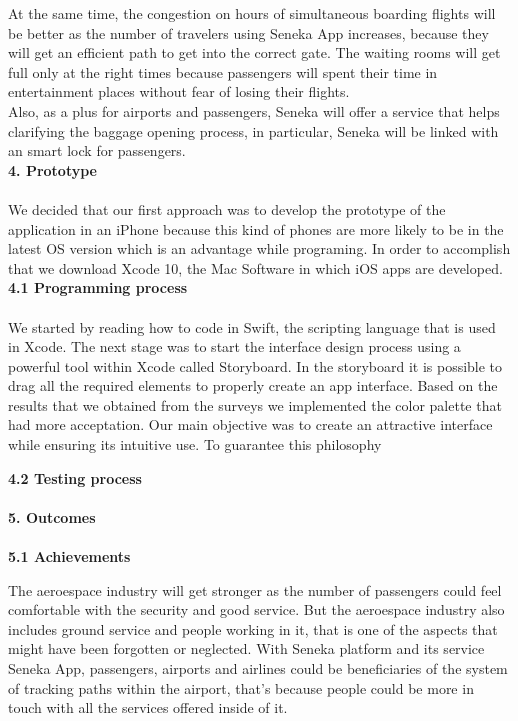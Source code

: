 \documentclass[]{article}
\begin{document}
At the same time, the congestion on hours of simultaneous boarding flights will be better as the number of travelers using Seneka App increases, because they will get an efficient path to get into the correct gate. The waiting rooms will get full only at the right times because passengers will spent their time in entertainment places without fear of losing their flights.\\

Also, as a plus for airports and passengers, Seneka will offer a service that helps clarifying the baggage opening process, in particular, Seneka will be linked with an smart lock for passengers.\\  

\Large{\textbf{4. Prototype}\\}\\

We decided that our first approach was to develop the prototype of the application in an iPhone because this kind of phones are more likely to be in the latest OS version which is an advantage while programing. In order to accomplish that we download Xcode 10, the Mac Software in which iOS apps are developed.\\

\Large{\textbf{4.1 Programming process}\\}\\

We started by reading how to code in Swift, the scripting language that is used in Xcode. The next stage was to start the interface design process using a powerful tool within Xcode called Storyboard. In the storyboard it is possible to drag all the required elements to properly create an app interface. Based on the results that we obtained from the surveys we implemented the color palette that had more acceptation. Our main objective was to create an attractive interface while ensuring its intuitive use. To guarantee this philosophy 

\Large{\textbf{4.2 Testing process}\\}\\


\Large{\textbf{5. Outcomes}\\}\\

\Large{\textbf{5.1 Achievements}\\}

The aeroespace industry will get stronger as the number of passengers could feel comfortable with the security and good service. But the aeroespace industry also includes ground service and people working in it, that is one of the aspects that might have been forgotten or neglected. With Seneka platform and its service Seneka App, passengers, airports and airlines could be beneficiaries of the system of tracking paths within the airport, that's because people could be more in touch with all the services offered inside of it.\\
\end{document}
